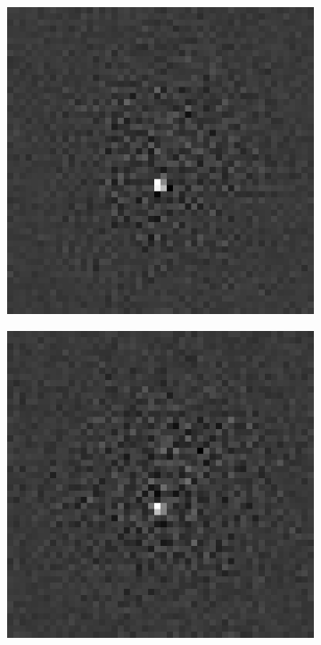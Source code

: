 \begin{figure}[htpb]
\begin{subfigure}{.25\textwidth}
\end{subfigure}%
\begin{subfigure}{.25\textwidth}
\includegraphics[width=1\textwidth]{img/noisyPOCsigma75}
\end{subfigure}%
\begin{subfigure}{.25\textwidth}
\includegraphics[width=1\textwidth]{img/noisyPOCsigma150}

\end{subfigure}
\end{figure}
